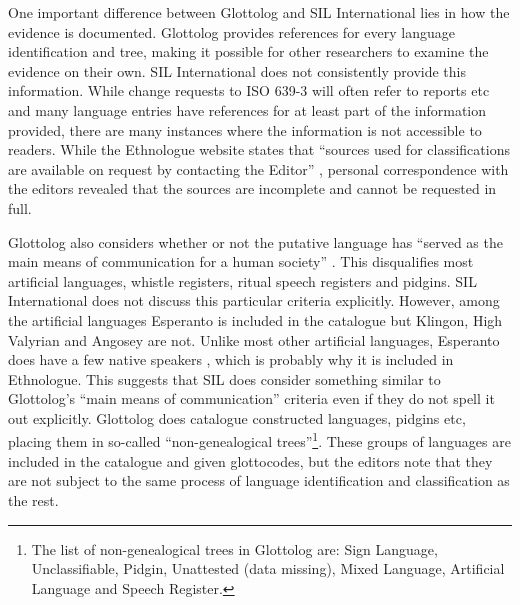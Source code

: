 \documentclass[a4paper,10pt]{article} %
\begin{document}
One important difference between Glottolog and SIL International lies in how the evidence is documented. Glottolog provides references for every language identification and tree, making it possible for other researchers to examine the evidence on their own. SIL International does not consistently provide this information. While change requests to ISO 639-3 will often refer to reports etc and many language entries have references for at least part of the information provided, there are many instances where the information is not accessible to readers. While the Ethnologue website states that ``sources used for classifications are available on request by contacting the Editor'' \citep{ethnologue2019lgident}, personal correspondence with the editors revealed that the sources are incomplete and cannot be requested in full.

Glottolog also considers whether or not the putative language has ``served as the main means of communication for a human society'' \citep{glottologlanguoids}. This disqualifies most artificial languages, whistle registers, ritual speech registers and pidgins. SIL International does not discuss this particular criteria explicitly. However, among the artificial languages Esperanto is included in the catalogue but  Klingon, High Valyrian and Angosey are not. Unlike most other artificial languages,  Esperanto does have a few native speakers \citep{bergen2001nativization}, which is probably why it is included in Ethnologue. This suggests that SIL does consider something similar to Glottolog's ``main means of communication'' criteria even if they do not spell it out explicitly. Glottolog does catalogue constructed languages, pidgins etc, placing them in so-called ``non-genealogical trees''\footnote{The list of non-genealogical trees in Glottolog are: Sign Language, Unclassifiable, Pidgin, Unattested (data missing), Mixed Language, Artificial Language and Speech Register.}. These groups of languages are included in the catalogue and given glottocodes, but the editors note that they are not subject to the same process of language identification and classification as the rest.%
\end{document}
